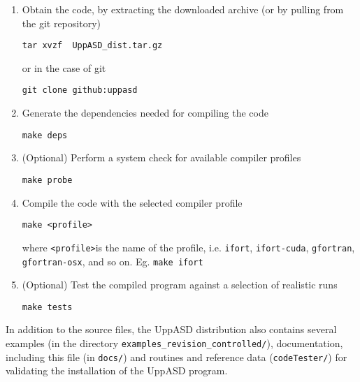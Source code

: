 \documentclass[11pt,fleqn,a4]{book} %
\begin{document}
\begin{gBox}
\begin{enumerate}
\item Obtain the code, by extracting the downloaded archive (or by pulling from the git repository)
\begin{verbatim}
tar xvzf  UppASD_dist.tar.gz
\end{verbatim}
or in the case of git
\begin{verbatim}
git clone github:uppasd
\end{verbatim}
\item Generate the dependencies needed for compiling the code
\begin{verbatim}
make deps
\end{verbatim}
\item (Optional) Perform a system check for available compiler profiles
\begin{verbatim}
make probe
\end{verbatim} 
\item Compile the code with the selected compiler profile
\begin{verbatim}
make <profile>
\end{verbatim}
where \texttt{<profile>}is the name of the profile, i.e. \texttt{ifort}, \texttt{ifort-cuda}, \texttt{gfortran}, \\
\texttt{gfortran-osx}, and so on. Eg. \texttt{make ifort} \\
\item (Optional) Test the compiled program against a selection of realistic runs
\begin{verbatim}
make tests
\end{verbatim}
\end{enumerate}
\end{gBox}

\noindent In addition to the source files, the UppASD distribution also contains several examples (in the directory \texttt{examples_revision_controlled/}), documentation, including this file (in  \texttt{docs/}) and routines and reference data (\texttt{codeTester/}) for validating the installation of the UppASD program.
\end{document}
